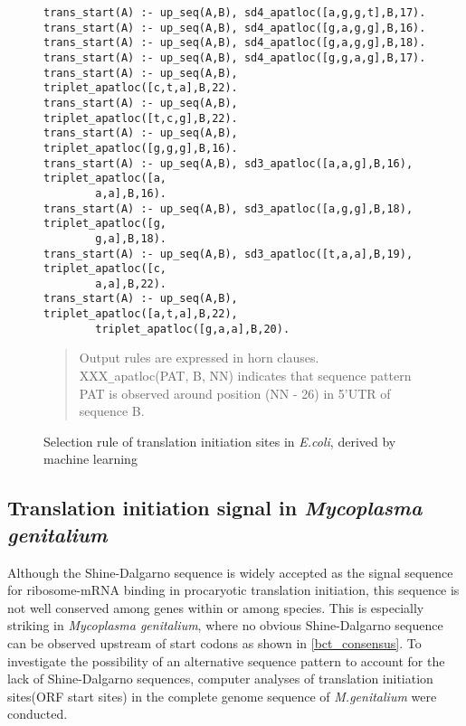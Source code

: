 \begin{figure}
\begin{tt}
\begin{verbatim}
trans_start(A) :- up_seq(A,B), sd4_apatloc([a,g,g,t],B,17).
trans_start(A) :- up_seq(A,B), sd4_apatloc([g,a,g,g],B,16).
trans_start(A) :- up_seq(A,B), sd4_apatloc([g,a,g,g],B,18).
trans_start(A) :- up_seq(A,B), sd4_apatloc([g,g,a,g],B,17).
trans_start(A) :- up_seq(A,B), triplet_apatloc([c,t,a],B,22).
trans_start(A) :- up_seq(A,B), triplet_apatloc([t,c,g],B,22).
trans_start(A) :- up_seq(A,B), triplet_apatloc([g,g,g],B,16).
trans_start(A) :- up_seq(A,B), sd3_apatloc([a,a,g],B,16), triplet_apatloc([a,
        a,a],B,16).
trans_start(A) :- up_seq(A,B), sd3_apatloc([a,g,g],B,18), triplet_apatloc([g,
        g,a],B,18).
trans_start(A) :- up_seq(A,B), sd3_apatloc([t,a,a],B,19), triplet_apatloc([c,
        a,a],B,22).
trans_start(A) :- up_seq(A,B), triplet_apatloc([a,t,a],B,22),
        triplet_apatloc([g,a,a],B,20).
\end{verbatim}
\end{tt}
\caption{Selection rule of translation initiation sites in {\it
 E.coli}, derived by machine learning}
\label{derived_rule}
\begin{small}
\begin{quotation}
Output rules are expressed in horn clauses.  XXX\verb+_+apatloc(PAT, B,
NN) indicates that sequence pattern PAT is observed around position (NN -
 26) in 5'UTR of sequence B.
\end{quotation}
\end{small}
\end{figure}

\subsection{Translation initiation signal in {\it Mycoplasma genitalium}}
\label{trans_myco}

 Although the Shine-Dalgarno sequence is widely accepted as the signal
sequence for ribosome-mRNA binding in procaryotic translation
initiation, this sequence is not well conserved among genes within or
among species.  This is especially striking in {\it Mycoplasma
genitalium}\cite{mglabel10}, where no obvious Shine-Dalgarno sequence can
be observed upstream of start codons as shown in \ref{bct_consensus}.
To investigate the possibility of an alternative sequence pattern to
account for the lack of Shine-Dalgarno sequences, computer analyses of
translation initiation sites(ORF start sites) in the complete genome
sequence of {\it M.genitalium}\cite{mglabel14} were conducted.

